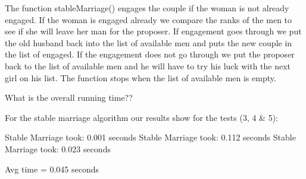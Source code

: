 \documentclass{article}
\begin{document}
    The function stableMarriage() engages the couple if the woman is not already engaged.
    If the woman is engaged already we compare the ranks of the men to see if she will leave her man for the proposer.
    If engagement goes through we put the old husband back into the list of available men and puts the new couple in the list of engaged.
    If the engagement does not go through we put the proposer back to the list of available men and he will have to try his luck with the next girl on his list.
    The function stops when the list of available men is empty.

    What is the overall running time??

    For the stable marriage algorithm our results show for the tests (3, 4 & 5):

    Stable Marriage took: 0.001 seconds
    Stable Marriage took: 0.112 seconds
    Stable Marriage took: 0.023 seconds

    Avg time = 0.045 seconds
\end{document}
